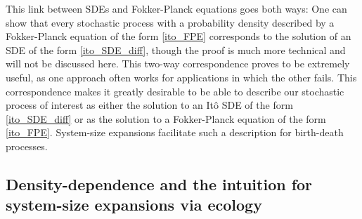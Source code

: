 This link between SDEs and Fokker-Planck equations goes both ways: One can show that every stochastic process with a probability density described by a Fokker-Planck equation of the form \eqref{ito_FPE} corresponds to the solution of an SDE of the form \eqref{ito_SDE_diff}, though the proof is much more technical and will not be discussed here. This two-way correspondence proves to be extremely useful, as one approach often works for applications in which the other fails. This correspondence makes it greatly desirable to be able to describe our stochastic process of interest as either the solution to an It\^o SDE of the form \eqref{ito_SDE_diff} or as the solution to a Fokker-Planck equation of the form \eqref{ito_FPE}. System-size expansions facilitate such a description for birth-death processes.

\subsection{Density-dependence and the intuition for system-size expansions via ecology}\label{sec_intuition_sys_size}

